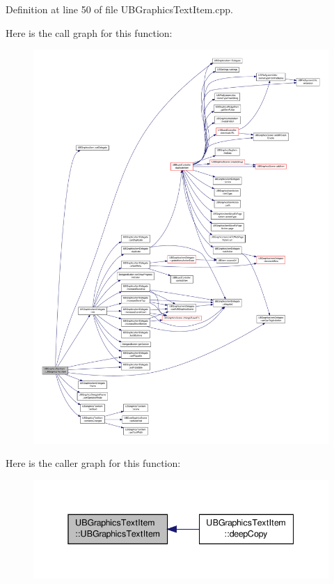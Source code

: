 Definition at line 50 of file U\-B\-Graphics\-Text\-Item.\-cpp.



Here is the call graph for this function\-:
\nopagebreak
\begin{figure}[H]
\begin{center}
\leavevmode
\includegraphics[width=350pt]{da/d65/class_u_b_graphics_text_item_acbf06a6d840ac7b6c95950e39dcd94b9_cgraph}
\end{center}
\end{figure}




Here is the caller graph for this function\-:
\nopagebreak
\begin{figure}[H]
\begin{center}
\leavevmode
\includegraphics[width=342pt]{da/d65/class_u_b_graphics_text_item_acbf06a6d840ac7b6c95950e39dcd94b9_icgraph}
\end{center}
\end{figure}


